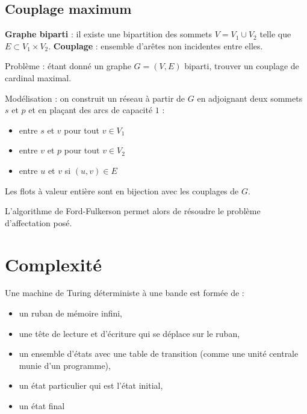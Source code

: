 \documentclass[a4paper,11pt,twocolumn]{article}
\begin{document}
	\subsection{Couplage maximum}

		\begin{defn}
		\textbf{Graphe biparti} : il existe une bipartition des sommets $V = V_1 \cup V_2$ telle que $E \subset V_1 \times V_2$.
		\textbf{Couplage} : ensemble d’arêtes non incidentes entre elles.
		\end{defn}

		Problème : étant donné un graphe $G = (V,E)$ biparti, trouver un couplage de cardinal maximal.

		Modélisation : on construit un réseau à partir de $G$ en adjoignant deux sommets $s$ et $p$ et en plaçant des arcs de capacité $1$ :
		\begin{itemize}
			\item entre $s$ et $v$ pour tout $v \in V_1$
			\item entre $v$ et $p$ pour tout $v \in V_2$
			\item entre $u$ et $v$ si $(u,v) \in E$
		\end{itemize}

		\begin{pop}
		Les flots à valeur entière sont en bijection avec les couplages de $G$.
		\end{pop}

		L'algorithme de Ford-Fulkerson permet alors de résoudre le problème d'affectation posé.


\section{Complexité}

	\begin{defn}
	Une machine de Turing déterministe à une bande est formée de :
	\begin{itemize}
	\item un ruban de mémoire infini,
	\item une tête de lecture et d'écriture qui se déplace sur le ruban,
	\item un ensemble d'états avec une table de transition (comme une unité centrale munie d'un programme),
	\item un état particulier qui est l'état initial,
	\item un état final
	\end{itemize}
	\end{defn}
\end{document}
